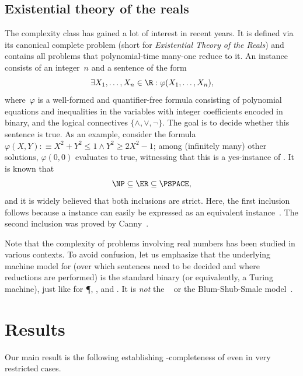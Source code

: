 \documentclass{toc}
\begin{document}
\subsection{Existential theory of the reals}
The complexity class \ER has gained a lot of interest in recent years.
It is defined via its canonical complete problem \ETR (short for \emph{Existential Theory of the Reals}) and contains all problems that polynomial-time many-one reduce to it.
An \ETR instance consists of an integer~$n$ and a sentence of the form
\[
    \exists X_1, \ldots, X_n \in \R :
    \varphi(X_1, \ldots, X_n),
\]
where~$\varphi$ is a well-formed and quantifier-free formula consisting of polynomial equations and inequalities in the variables with integer coefficients encoded in binary, and the logical connectives $\{\land, \lor, \lnot\}$.
The goal is to decide whether this sentence is true.
As an example, consider the formula $\varphi(X,Y) :\equiv X^2 + Y^2 \leq 1 \land Y^2 \geq 2X^2 - 1$;
among (infinitely many) other solutions, $\varphi(0,0)$ evaluates to true, witnessing that this is a yes-instance of \ETR.
It is known that
\[
    \NP \subseteq \ER \subseteq \PSPACE
    \text{,}
\]
and it is widely believed that both inclusions are strict.
Here, the first inclusion follows because a  instance can easily be expressed as an equivalent \ETR instance~\cite{Shor1991_Stretchability}.
The second inclusion was proved by Canny~\cite{Canny1988_PSPACE}.

Note that the complexity of problems involving real numbers %
has been  %
studied in various contexts.
To avoid confusion, let us emphasize that the underlying machine model for \ER 
(over which sentences need to be decided and where
reductions are %
performed)  %
is the standard binary \wordRAM (or equivalently, a Turing machine), just 
like for \P, \NP, and \PSPACE.
It is \emph{not} the \realRAM~\cite{Erickson2022_SmoothingTheGap} or the Blum-Shub-Smale model~\cite{Blum1989_ComputationOverTheReals}.

\section{Results}
\label{sec:results}

Our main result is the following  establishing \ER-completeness
of \trainNN even in very restricted cases. %
\end{document}
